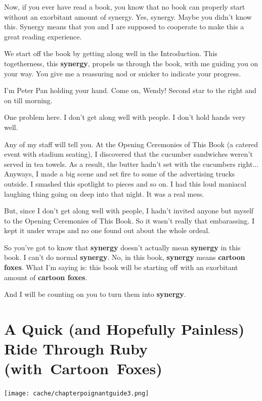 \documentclass[12pt,twoside]{report}
\begin{document}
Now, if you ever have read a book, you know that no book can properly
start without an exorbitant amount of synergy.  Yes, synergy.  Maybe
you didn't know this.  Synergy means that you and I are supposed to
cooperate to make this a great reading experience.

We start off the book by getting along well in the Introduction.  This
togetherness, this {\bf synergy}, propels us through the book, with me
guiding you on your way.  You give me a reassuring nod or snicker to
indicate your progress.

I'm Peter Pan holding your hand.  Come on, Wendy!  Second star to the
right and on till morning.

One problem here.  I don't get along well with people.  I don't hold
hands very well.

Any of my staff will tell you.  At the Opening Ceremonies of This Book
(a catered event with stadium seating), I discovered that the cucumber
sandwiches weren't served in tea towels. As a result, the butter
hadn't set with the cucumbers right... Anyways, I made a big scene and
set fire to some of the advertising trucks outside.  I smashed this
spotlight to pieces and so on.  I had this loud maniacal laughing
thing going on deep into that night.  It was a real mess.

But, since I don't get along well with people, I hadn't invited anyone
but myself to the Opening Ceremonies of This Book.  So it wasn't
really that embarassing.  I kept it under wraps and no one found out
about the whole ordeal.

So you've got to know that {\bf synergy} doesn't actually mean {\bf
  synergy} in this book.  I can't do normal {\bf synergy}. No, in this
book, {\bf synergy} means {\bf cartoon foxes}.  What I'm saying is:
this book will be starting off with an exorbitant amount of {\bf
  cartoon foxes}.

And I will be counting on you to turn them into {\bf synergy}.

\newpage
\thispagestyle{empty}
\mbox{}

\cleartooddpage

\chapter{A Quick (and Hopefully Painless) Ride Through Ruby \mbox{(with Cartoon Foxes)}}
\vfill
\begin{center}
  \texttt{[image: cache/chapterpoignantguide3.png]}
\end{center}
\vspace{4.6cm}
\newpage
\thispagestyle{empty}
\mbox{}
\clearpage
\end{document}
